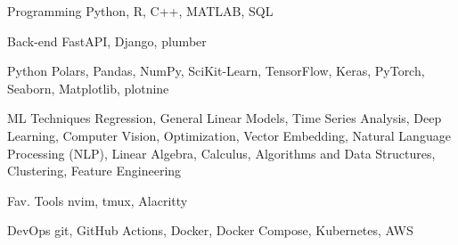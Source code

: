 

\begin{cvskills}

  \cvskill
    {Programming}
    {Python, R, C++, MATLAB, SQL}


  \cvskill
    {Back-end}
    {FastAPI, Django, plumber}

  \cvskill
    {Python}
    {Polars, Pandas, NumPy, SciKit-Learn, TensorFlow, Keras, PyTorch, Seaborn, Matplotlib, plotnine}

  \cvskill
    {ML Techniques}
    {Regression, General Linear Models, Time Series Analysis, Deep Learning, Computer Vision, Optimization, Vector Embedding, Natural Language Processing (NLP), Linear Algebra, Calculus, Algorithms and Data Structures, Clustering, Feature Engineering}

  \cvskill
    {Fav. Tools}
    {nvim, tmux, Alacritty}

  \cvskill
    {DevOps}
    {git, GitHub Actions, Docker, Docker Compose, Kubernetes, AWS}

\end{cvskills}
